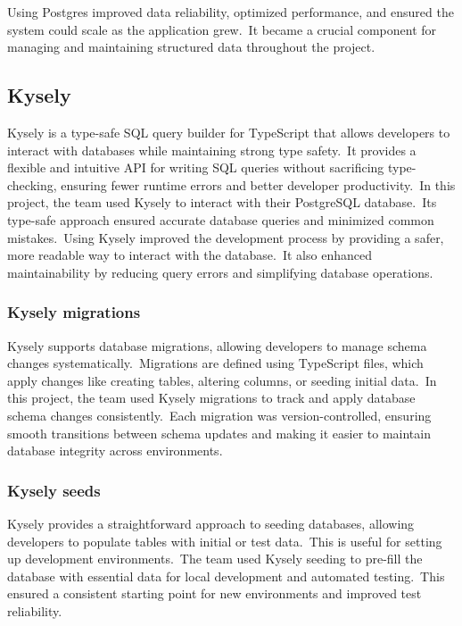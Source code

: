 Using Postgres improved data reliability, optimized performance, and ensured the system could scale as the application grew.\ It became a crucial component for managing and maintaining structured data throughout the project.

\subsection{Kysely}\label{subsec:kysely}

Kysely is a type-safe SQL query builder for TypeScript that allows developers to interact with databases while maintaining strong type safety.\ It provides a flexible and intuitive API for writing SQL queries without sacrificing type-checking, ensuring fewer runtime errors and better developer productivity.\ In this project, the team used Kysely to interact with their PostgreSQL database.\ Its type-safe approach ensured accurate database queries and minimized common mistakes.\ Using Kysely improved the development process by providing a safer, more readable way to interact with the database.\ It also enhanced maintainability by reducing query errors and simplifying database operations.\cite[Kysely]{kysely}

\subsubsection{Kysely migrations}\label{subsubsec:kysely-migrations}

Kysely supports database migrations, allowing developers to manage schema changes systematically.\ Migrations are defined using TypeScript files, which apply changes like creating tables, altering columns, or seeding initial data.\ In this project, the team used Kysely migrations to track and apply database schema changes consistently.\ Each migration was version-controlled, ensuring smooth transitions between schema updates and making it easier to maintain database integrity across environments.



\subsubsection{Kysely seeds}\label{subsubsec:kysely-seeds}

Kysely provides a straightforward approach to seeding databases, allowing developers to populate tables with initial or test data.\ This is useful for setting up development environments.\ The team used Kysely seeding to pre-fill the database with essential data for local development and automated testing.\ This ensured a consistent starting point for new environments and improved test reliability.


